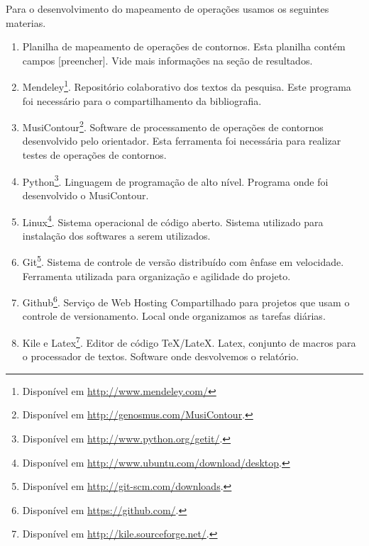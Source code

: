 \documentclass[11pt]{article}
\begin{document}
\label{sec:materiais}

Para o desenvolvimento do mapeamento de operações usamos os seguintes
materias.


\begin{enumerate}
\item Planilha de mapeamento de operações de contornos. Esta planilha
  contém campos [preencher]. Vide mais informações na seção de
  resultados.
\item Mendeley\footnote{Disponível em
    \url{http://www.mendeley.com/}}. Repositório colaborativo dos
  textos da pesquisa. Este programa foi necessário para o
  compartilhamento da bibliografia.
\item MusiContour\footnote{Disponível em
    \url{http://genosmus.com/MusiContour}.}. Software de processamento
  de operações de contornos desenvolvido pelo orientador. Esta
  ferramenta foi necessária para realizar testes de operações de
  contornos.
\item Python\footnote{Disponível em
  \url{http://www.python.org/getit/}.}. Linguagem de programação de
  alto nível. Programa onde foi desenvolvido o MusiContour.
\item Linux\footnote{Disponível em
  \url{http://www.ubuntu.com/download/desktop}.}. Sistema operacional 
  de código aberto. Sistema utilizado para instalação dos softwares a 
  serem utilizados.
\item Git\footnote{Disponível em
  \url{http://git-scm.com/downloads}.}. Sistema de controle de versão
distribuído com ênfase em velocidade. Ferramenta utilizada para organização
e agilidade do projeto.
\item Github\footnote{Disponível em
  \url{https://github.com/}.}. Serviço de Web Hosting Compartilhado
para projetos que usam o controle de versionamento. Local onde organizamos
as tarefas diárias.
\item Kile e Latex\footnote{Disponível em
  \url{http://kile.sourceforge.net/}.}. Editor de código
TeX/LateX. Latex, conjunto de macros para o processador de textos. Software 
onde desvolvemos o relatório.
\end{enumerate}

\end{document}
